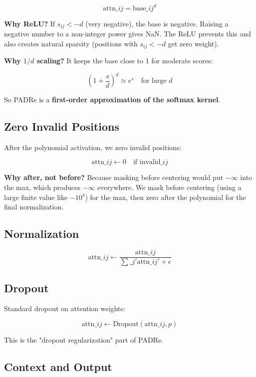 \[
\text{attn}\_{ij} = \text{base}\_{ij}^d
\tag{4.6}
\]

\textbf{Why ReLU?} If $s_{ij} < -d$ (very negative), the base is negative. Raising 
a negative number to a non-integer power gives NaN. The ReLU prevents this 
and also creates natural sparsity (positions with $s_{ij} < -d$ get zero weight).

\textbf{Why $1/d$ scaling?} It keeps the base close to 1 for moderate scores:

\[
\left(1 + \frac{s}{d}\right)^d \approx e^s \quad \text{for large } d
\tag{4.7}
\]

So PADRe is a \textbf{first-order approximation of the softmax kernel}.

\subsection{Zero Invalid Positions}

After the polynomial activation, we zero invalid positions:

\[
\text{attn}\_{ij} \leftarrow 0 \quad \text{if invalid}\_{ij}
\tag{4.8}
\]

\textbf{Why after, not before?} Because masking before centering would put 
$-\infty$ into the max, which produces $-\infty$ everywhere. We mask 
before centering (using a large finite value like $-10^4$) for the max, 
then zero after the polynomial for the final normalization.

\subsection{Normalization}

\[
\text{attn}\_{ij} \leftarrow \frac{\text{attn}\_{ij}}{\sum\_{j'} \text{attn}\_{ij'} + \epsilon}
\tag{4.9}
\]

\subsection{Dropout}

Standard dropout on attention weights:

\[
\text{attn}\_{ij} \leftarrow \text{Dropout}(\text{attn}\_{ij}, p)
\tag{4.10}
\]

This is the "dropout regularization" part of PADRe.

\subsection{Context and Output}

